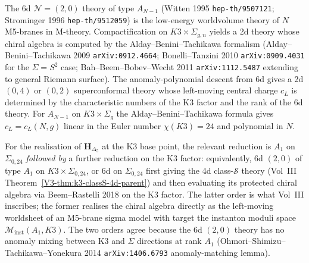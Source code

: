 \begin{remark}
\label{rem:3dg-witten-m5-6d-20-origin}
%
%
%
%
The 6d $\mathcal{N} = (2,0)$ theory of type $A_{N-1}$ (Witten 1995
\texttt{hep-th/9507121}; Strominger 1996
\texttt{hep-th/9512059}) is the low-energy worldvolume theory of
$N$ M5-branes in M-theory. Compactification on
$K3 \times \Sigma_{g,n}$ yields a 2d theory whose chiral algebra is
computed by the Alday--Benini--Tachikawa formalism
(Alday--Benini--Tachikawa 2009 \texttt{arXiv:0912.4664};
Bonelli--Tanzini 2010 \texttt{arXiv:0909.4031} for the
$\Sigma = S^{2}$ case; Bah--Beem--Bobev--Wecht 2011
\texttt{arXiv:1112.5487} extending to general Riemann surface).
The anomaly-polynomial descent from 6d gives a 2d $(0,4)$ or
$(0,2)$ superconformal theory whose left-moving central charge
$c_{L}$ is determined by the characteristic numbers of the
K3 factor and the rank of the 6d theory. For $A_{N-1}$ on
$K3 \times \Sigma_{g}$ the Alday--Benini--Tachikawa formula gives
$c_{L} = c_{L}(N, g)$ linear in the Euler number
$\chi(K3) = 24$ and polynomial in $N$.

For the realisation of
$\mathbf{H}_{\Delta_{5}}$ at the K3 base point, the relevant reduction is
$A_{1}$ on $\Sigma_{0,24}$ \emph{followed by} a further reduction on
the K3 factor: equivalently, 6d $(2,0)$ of type $A_{1}$ on
$K3 \times \Sigma_{0,24}$, or 6d on $\Sigma_{0,24}$ first giving the
4d class-$\mathcal{S}$ theory (Vol~III
Theorem~\ref*{V3-thm:k3-classS-4d-parent}) and then evaluating its
protected chiral algebra via Beem--Rastelli 2018 on the K3 factor.
The latter order is what Vol~III inscribes; the former realises the
chiral algebra directly as the left-moving worldsheet of an M5-brane
sigma model with target the instanton moduli space
$\mathcal{M}_{\mathrm{inst}}(A_{1}, K3)$. The two orders agree because
the 6d $(2,0)$ theory has no anomaly mixing between K3 and $\Sigma$
directions at rank $A_{1}$ (Ohmori--Shimizu--Tachikawa--Yonekura 2014
\texttt{arXiv:1406.6793} anomaly-matching lemma).
\end{remark}

